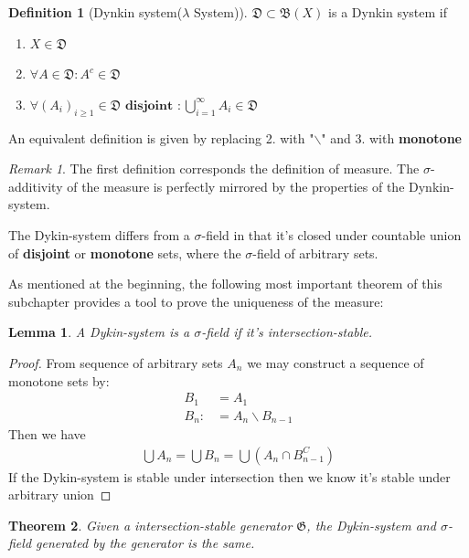 \documentclass[a4paper,11pt,oneside,fleqn]{book}
\newtheorem{theorem}{Theorem}[section]
\newtheorem{lemma}[theorem]{Lemma}
\theoremstyle{definition}
\newtheorem{definition}{Definition}[section]
\theoremstyle{remark}
\newtheorem*{remark}{Remark}
\begin{document}
\begin{definition}[Dynkin system($\lambda$ System)]
$\mathfrak{D}\subset \mathfrak{B}(X)$ is a Dynkin system if
\begin{enumerate}
	\item $X \in \mathfrak{D}$
	\item $\forall A \in \mathfrak{D}: A^c \in \mathfrak{D}$
	\item $\forall (A_i)_{i \geq 1} \in \mathfrak{D} \textbf{ disjoint }: \bigcup_{i = 1}^\infty A_i \in \mathfrak{D}$
\end{enumerate} 
An equivalent definition is given by replacing 2. with "$\backslash$" and 3. with \textbf{monotone}
\end{definition}
\begin{remark}
The first definition corresponds the definition of measure. The $\sigma$-additivity of the measure is perfectly mirrored by the properties of the Dynkin-system.\par 
The Dykin-system differs from a $\sigma$-field in that it's closed under countable union of \textbf{disjoint} or \textbf{monotone} sets, where the $\sigma$-field of arbitrary sets.\par 
As mentioned at the beginning, the following most important theorem of this subchapter provides a tool to prove the uniqueness of the measure:
\end{remark}

\begin{lemma}
	A Dykin-system is a $\sigma$-field if it's intersection-stable.
\end{lemma}
\begin{proof}
	From sequence of arbitrary sets $A_n$ we may construct a sequence of monotone sets by:
	\begin{align*}
		B_1 &= A_1\\
		B_n: &= A_n \backslash B_{n-1}
	\end{align*}
	Then we have
	\begin{align*}
		\bigcup A_n = \bigcup B_n = \bigcup(A_n \cap B_{n-1}^C)
	\end{align*}
	If the Dykin-system is stable under intersection then we know it's stable under arbitrary union
\end{proof}

\begin{theorem}
	Given a intersection-stable generator $\mathfrak{G}$, the Dykin-system and $\sigma$-field generated by the generator is the same.
\end{theorem}
\end{document}
